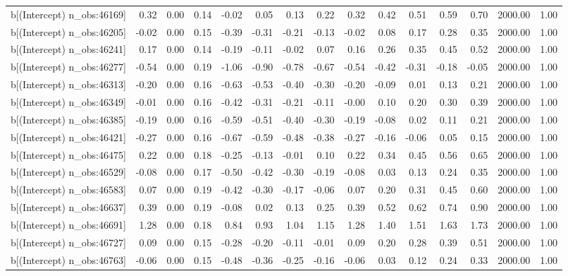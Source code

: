\begin{table}[ht]
\begin{tabular}{rrrrrrrrrrrrrrr}
  b[(Intercept) n\_obs:46169] & 0.32 & 0.00 & 0.14 & -0.02 & 0.05 & 0.13 & 0.22 & 0.32 & 0.42 & 0.51 & 0.59 & 0.70 & 2000.00 & 1.00 \\ 
  b[(Intercept) n\_obs:46205] & -0.02 & 0.00 & 0.15 & -0.39 & -0.31 & -0.21 & -0.13 & -0.02 & 0.08 & 0.17 & 0.28 & 0.35 & 2000.00 & 1.00 \\ 
  b[(Intercept) n\_obs:46241] & 0.17 & 0.00 & 0.14 & -0.19 & -0.11 & -0.02 & 0.07 & 0.16 & 0.26 & 0.35 & 0.45 & 0.52 & 2000.00 & 1.00 \\ 
  b[(Intercept) n\_obs:46277] & -0.54 & 0.00 & 0.19 & -1.06 & -0.90 & -0.78 & -0.67 & -0.54 & -0.42 & -0.31 & -0.18 & -0.05 & 2000.00 & 1.00 \\ 
  b[(Intercept) n\_obs:46313] & -0.20 & 0.00 & 0.16 & -0.63 & -0.53 & -0.40 & -0.30 & -0.20 & -0.09 & 0.01 & 0.13 & 0.21 & 2000.00 & 1.00 \\ 
  b[(Intercept) n\_obs:46349] & -0.01 & 0.00 & 0.16 & -0.42 & -0.31 & -0.21 & -0.11 & -0.00 & 0.10 & 0.20 & 0.30 & 0.39 & 2000.00 & 1.00 \\ 
  b[(Intercept) n\_obs:46385] & -0.19 & 0.00 & 0.16 & -0.59 & -0.51 & -0.40 & -0.30 & -0.19 & -0.08 & 0.02 & 0.11 & 0.21 & 2000.00 & 1.00 \\ 
  b[(Intercept) n\_obs:46421] & -0.27 & 0.00 & 0.16 & -0.67 & -0.59 & -0.48 & -0.38 & -0.27 & -0.16 & -0.06 & 0.05 & 0.15 & 2000.00 & 1.00 \\ 
  b[(Intercept) n\_obs:46475] & 0.22 & 0.00 & 0.18 & -0.25 & -0.13 & -0.01 & 0.10 & 0.22 & 0.34 & 0.45 & 0.56 & 0.65 & 2000.00 & 1.00 \\ 
  b[(Intercept) n\_obs:46529] & -0.08 & 0.00 & 0.17 & -0.50 & -0.42 & -0.30 & -0.19 & -0.08 & 0.03 & 0.13 & 0.24 & 0.35 & 2000.00 & 1.00 \\ 
  b[(Intercept) n\_obs:46583] & 0.07 & 0.00 & 0.19 & -0.42 & -0.30 & -0.17 & -0.06 & 0.07 & 0.20 & 0.31 & 0.45 & 0.60 & 2000.00 & 1.00 \\ 
  b[(Intercept) n\_obs:46637] & 0.39 & 0.00 & 0.19 & -0.08 & 0.02 & 0.13 & 0.25 & 0.39 & 0.52 & 0.62 & 0.74 & 0.90 & 2000.00 & 1.00 \\ 
  b[(Intercept) n\_obs:46691] & 1.28 & 0.00 & 0.18 & 0.84 & 0.93 & 1.04 & 1.15 & 1.28 & 1.40 & 1.51 & 1.63 & 1.73 & 2000.00 & 1.00 \\ 
  b[(Intercept) n\_obs:46727] & 0.09 & 0.00 & 0.15 & -0.28 & -0.20 & -0.11 & -0.01 & 0.09 & 0.20 & 0.28 & 0.39 & 0.51 & 2000.00 & 1.00 \\ 
  b[(Intercept) n\_obs:46763] & -0.06 & 0.00 & 0.15 & -0.48 & -0.36 & -0.25 & -0.16 & -0.06 & 0.03 & 0.12 & 0.24 & 0.33 & 2000.00 & 1.00 \\ 

\end{tabular}
\end{table}
